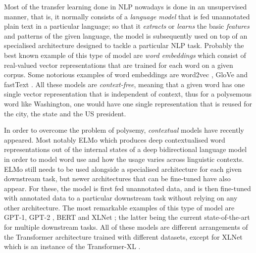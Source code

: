 Most of the transfer learning done in NLP nowadays is done in an unsupervised manner, that is, it normally consists of a  \emph{language model} that is fed unannotated plain text in a particular language; so that it \emph{extracts} or \emph{learns} the basic \emph{features} and patterns of the given language, the model is subsequently used on top of an specialised architecture designed to tackle a particular NLP task. Probably the best known example of this type of model are \emph{word embeddings} which consist of real-valued vector representations that are trained for each word on a given corpus. Some notorious examples of word embeddings are word2vec \citep{mikolov-etal-2013-distributed}, GloVe \citep{pennington-etal-2014-glove} and \mbox{fastText} \citep{mikolov-etal-2018-advances}. All these models are \emph{context-free}, meaning that a given word has one single vector representation that is independent of context, thus for a polysemous word like Washington, one would have one single representation that is reused for the city, the state and the US president.

In order to overcome the problem of polysemy, \emph{contextual} models have recently appeared. Most notably ELMo \citep{peters-etal-2018-deep} which produces deep contextualised word representations out of the internal states of a deep bidirectional language model in order to model word use and how the usage varies across linguistic contexts. ELMo still needs to be used alongside a specialised architecture for each given downstream task, but newer architectures that can be fine-tuned have also appear. For these, the model is first fed unannotated data, and is then fine-tuned with annotated data to a particular downstream task without relying on any other architecture. The most remarkable examples of this type of model are GPT-1, GPT-2 \citep{radford-etal-2018-improving,radford-etal-2019-language}, BERT \citep{devlin-etal-2019-bert} and XLNet \citep{yang-etal-2019-xlnet}; the latter being the current state-of-the-art for multiple downstream tasks. All of these models are different arrangements of the Transformer architecture \citep{vaswani-etal-2017-attention} trained with different datasets, except for XLNet which is an instance of the Transformer-XL \citep{dai-etal-2019-transformer}.

